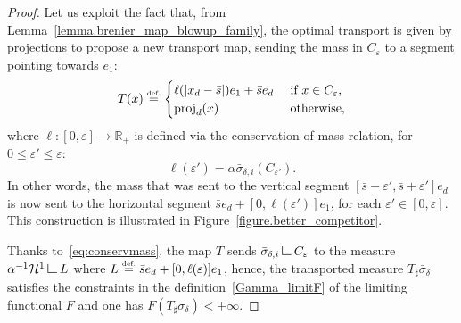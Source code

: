 \documentclass[10pt]{amsart}
\theoremstyle{definition}
\newcommand{\eqdef}{\ensuremath{\stackrel{\mbox{\upshape\tiny def.}}{=}}}
\newcommand\LM[1]{\hbox{\vrule width.5pt \vbox to#1pt{\vfill \hrule width#1pt height.5pt}}}
\newcommand\LL{{\mathchoice {\>\LM7\>}{\>\LM7\>}{\,\LM5\,}{\,\LM{3.35}\,}}}
\newcommand{\mres}{\LL}
\newcommand\cH{\mathcal{H}}
\newcommand{\RR}{\mathbb{R}}
\DeclareMathOperator{\proj}{proj}
\begin{document}
\begin{proof}
Let us exploit the fact that, from Lemma~\ref{lemma.brenier_map_blowup_family}, the optimal transport is given by projections to propose a new transport map, sending the mass in $C_{\varepsilon}$ to a segment pointing towards $e_1$:
\[
T(x)
\eqdef
\begin{cases}
\ell(|x_d-\bar s|)e_1 + \bar s e_d& \text{ if $x \in C_{\varepsilon}$},\\
\proj_d(x)& \text{ otherwise,}
\end{cases}
\]
where $\ell:[0,\varepsilon] \to \RR_+$ is defined via the conservation of mass relation, for $0\le \varepsilon'\le \varepsilon$:
\begin{equation}\label{eq:conservmass}
\ell(\varepsilon') = \alpha \bar \sigma_{\delta, i}(C_{\varepsilon'}).
\end{equation}
In other words, the mass that was sent to the vertical segment $[\bar s-\varepsilon', \bar s+\varepsilon']e_d$ is now sent to the horizontal segment $\bar s e_d+[0, \ell(\varepsilon')]e_1$,
for each $\varepsilon'\in [0,\varepsilon]$.
This construction is illustrated in Figure~\ref{figure.better_competitor}.

Thanks to~\eqref{eq:conservmass}, the map $T$ sends $\bar \sigma_{\delta, i}\mres C_\varepsilon$ to
the measure $\alpha^{-1}\cH^1\mres L$
where $L\eqdef \bar s e_d+[0,\ell(\varepsilon)]e_1$,
hence, the transported measure $T_\sharp \bar \sigma_{\delta}$ satisfies the constraints in the definition~\eqref{Gamma_limitF} of the limiting functional $F$ and one has $F(T_\sharp \bar \sigma_{\delta})<+\infty$.


\end{proof}
\end{document}
